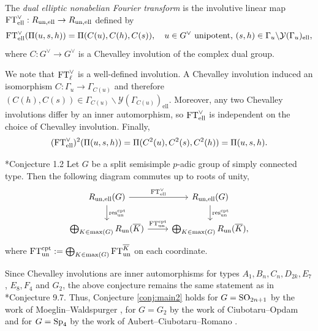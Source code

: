\begin{definition}
    The \textit{dual elliptic nonabelian Fourier transform} is the involutive linear map $\mathrm{FT}^\vee_{\mathrm{ell}}:R_{\mathrm{un},\mathrm{ell}}\rightarrow R_{\mathrm{un},\mathrm{ell}}$ defined by
    \begin{equation*}
        \mathrm{FT}^\vee_{\mathrm{ell}}(\Pi(u,s,h))=\Pi(C(u),C(h),C(s)),\quad u\in G^\vee\text{ unipotent, }(s,h)\in\Gamma_u\backslash\mathcal{Y}(\Gamma_u)_{\mathrm{ell}},
    \end{equation*}
    where $C:G^\vee\to G^\vee$ is a Chevalley involution of the complex dual group.
\end{definition}
We note that $\mathrm{FT}^\vee_{\ell}$ is a well-defined involution. A Chevalley involution induced an isomorphism $C:\Gamma_u\to\Gamma_{C(u)}$ and therefore $(C(h),C(s))\in\Gamma_{C(u)}\backslash\mathcal{Y}(\Gamma_{C(u)})_{\mathrm{ell}}$. Moreover, any two Chevalley involutions differ by an inner automorphism, so $\mathrm{FT}^\vee_{\mathrm{ell}}$ is independent on the choice of Chevalley involution. Finally, 
$$(\mathrm{FT}^\vee_{\mathrm{ell}})^2(\Pi(u,s,h))=\Pi(C^2(u),C^2(s),C^2(h))=\Pi(u,s,h).$$
\begin{conjecture}\cite{AubertCiubotaruRomano2024}*{Conjecture 1.2}\label{conj:main2}
    Let $G$ be a split semisimple $p$-adic group of simply connected type. Then the following diagram commutes up to roots of unity,
    \begin{equation}\label{eqn:diagram}
        \begin{tikzcd}
        R_{\un,\text{ell}}(G) \arrow[r, "\FT^\vee_{\text{ell}}"] \arrow[d, "\res_{\un}^{\cpt}"] & R_{\un,\text{ell}}(G) \arrow[d, "\res_{\un}^{\cpt}"] \\
        \bigoplus_{K\in\max(G)}R_{\un}(\overline{K}) \arrow[r, "\FT^{\cpt}_{\un}"] & \bigoplus_{K\in\max(G)}R_{\un}(\overline{K}),
        \end{tikzcd}  
    \end{equation}
    where $\mathrm{FT}^{\mathrm{cpt}}_{\mathrm{un}}:=\bigoplus_{K\in\max(G)}\mathrm{FT}^{\overline{K}}_{\mathrm{un}}$ on each coordinate.
\end{conjecture}

\begin{remark}
    Since Chevalley involutions are inner automorphisms for types $A_1,B_n,C_n,D_{2k},E_7$, $E_8,F_4$ and $G_2$, the above conjecture remains the same statement as in \cite{AubertCiubotaruRomano2024}*{Conjecture 9.7}. Thus, Conjecture \ref{conj:main2} holds for $G=\mathrm{SO}_{2n+1}$ by the work of Moeglin--Waldspurger \cite{MoglinWaldspurger2003}, for $G=G_2$ by the work of Ciubotaru--Opdam \cite{CiubotaruOpdam2010} and for $G=\mathrm{Sp}_4$ by the work of Aubert--Ciubotaru--Romano \cite{AubertCiubotaruRomano2024}. 
\end{remark}

